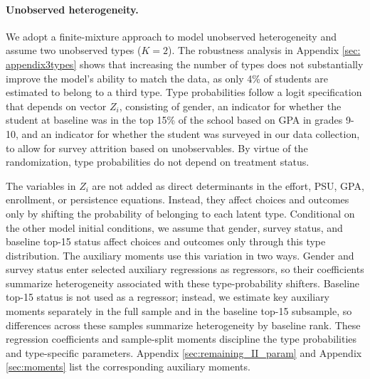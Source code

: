 \paragraph{Unobserved heterogeneity.} We adopt a finite-mixture approach to model unobserved heterogeneity and assume two unobserved types ($K=2$). The robustness analysis in Appendix \ref{sec: appendix3types} shows that increasing the number of types does not substantially improve the model's ability to match the data, as only 4\% of students are estimated to belong to a third type. Type probabilities follow a logit specification that depends on vector $Z_i$, consisting of gender, an indicator for whether the student at baseline was in the top 15\% of the school based on GPA in grades 9-10, and an indicator for whether the student was surveyed in our data collection, to allow for survey attrition based on unobservables. By virtue of the randomization, type probabilities do not depend on treatment status.\par 
The variables in $Z_i$ are not added as direct determinants in the effort, PSU, GPA, enrollment, or persistence equations. Instead, they affect choices and outcomes only by shifting the probability of belonging to each latent type. Conditional on the other model initial conditions, we assume that gender, survey status, and baseline top-15 status affect choices and outcomes only through this type distribution. The auxiliary moments use this variation in two ways. Gender and survey status enter selected auxiliary regressions as regressors, so their coefficients summarize heterogeneity associated with these type-probability shifters. Baseline top-15 status is not used as a regressor; instead, we estimate key auxiliary moments separately in the full sample and in the baseline top-15 subsample, so differences across these samples summarize heterogeneity by baseline rank. These regression coefficients and sample-split moments discipline the type probabilities and type-specific parameters. Appendix \ref{sec:remaining_II_param} and Appendix \ref{sec:moments} list the corresponding auxiliary moments.\par



